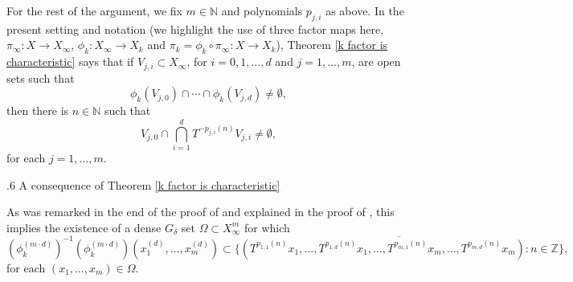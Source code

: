 \documentclass[reqno]{amsart}
\makeatletter
\def\Z{{\mathbb Z}}
\def\N{{\mathbb N}}
\theoremstyle{definition}
\def\subsection{\@startsection{subsection}{2}%
  \z@{.4\linespacing\@plus.7\linespacing}
{.6\baselineskip}%
  {\normalfont\centering\bfseries}%
}
\theoremstyle{remark}
\def\N{{\mathbb N}}
\makeatother
\begin{document}
For the rest of the argument, we fix $m\in \N$ 
and polynomials $p_{j,i}$ as above. In the present setting and notation (we highlight the use of three factor maps here, $\pi_{\infty}:X\to X_{\infty}$, $\phi_k:X_{\infty}\to X_k$ and $\pi_k=\phi_k\circ \pi_{\infty}: X\to X_k$), Theorem \ref{k factor is characteristic} says that if $V_{j,i}\subset X_{\infty}$, for $i=0,1,\ldots,d$ and 
$j=1,\ldots,m$, are open sets such that 
$$\phi_k(V_{j,0}) \cap \cdots \cap \phi_k(V_{j,d}) \neq \emptyset, $$
then there is $n\in \N$ such that 
$$V_{j,0} \cap \bigcap_{i=1}^d T^{-p_{j,i}(n)}V_{j,i} \neq \emptyset,$$
for each $j=1,\ldots,m$.

\subsection{A consequence of Theorem \ref{k factor is characteristic}}

As was remarked in the
end of the proof of \cite[Theorem 3.6]{Ye_Yu} and 
explained in the proof of \cite[Theorem 3.7]{Huang_Shao_Ye}, 
this implies the existence of a dense 
$G_{\delta}$ 
set $\Omega \subset X_{\infty}^m$ for which 
\begin{equation}\label{same return time app 2}(\phi_k^{(m\cdot d)})^{-1}(\phi_k^{(m\cdot d)})(x_1^{(d)},\ldots,x_m^{(d)}) \subset \overline{\{(T^{p_{1,1}(n)}x_1,\ldots,T^{p_{1,d}(n)}x_1,\ldots,T^{p_{m,1}(n)}x_m,\ldots,T^{p_{m,d}(n)}x_m):n\in \Z\}},
\end{equation}
for each $(x_1,\ldots,x_m)\in \Omega$. 
\end{document}
